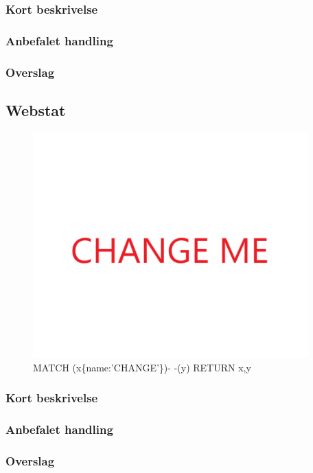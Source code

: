 \documentclass{article}
\begin{document}
\subsubsection{Kort beskrivelse}
\subsubsection{Anbefalet handling}
\subsubsection{Overslag}
\subsection{Webstat}
\begin{figure}[h]
\includegraphics[width=300pt]{CHANGE.PNG}
\caption{MATCH (x\{name:'CHANGE'\})- -(y) RETURN x,y}
\end{figure}
\subsubsection{Kort beskrivelse}
\subsubsection{Anbefalet handling}
\subsubsection{Overslag}
\end{document}
